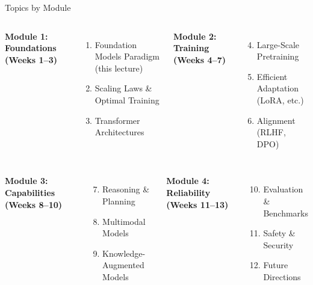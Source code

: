 \documentclass[aspectratio=169,10pt]{beamer}
\begin{document}
\begin{frame}{Topics by Module}
  \begin{columns}[T]
      \textbf{Module 1: Foundations (Weeks 1--3)}
      \begin{enumerate}
        \item Foundation Models Paradigm (this lecture)
        \item Scaling Laws \& Optimal Training
        \item Transformer Architectures
      \end{enumerate}

      \textbf{Module 2: Training (Weeks 4--7)}
      \begin{enumerate}
        \setcounter{enumi}{3}
        \item Large-Scale Pretraining
        \item Efficient Adaptation (LoRA, etc.)
        \item Alignment (RLHF, DPO)
      \end{enumerate}
  \end{columns}

  \vspace{0.3cm}

  \begin{columns}[T]
      \textbf{Module 3: Capabilities (Weeks 8--10)}
      \begin{enumerate}
        \setcounter{enumi}{6}
        \item Reasoning \& Planning
        \item Multimodal Models
        \item Knowledge-Augmented Models
      \end{enumerate}

      \textbf{Module 4: Reliability (Weeks 11--13)}
      \begin{enumerate}
        \setcounter{enumi}{9}
        \item Evaluation \& Benchmarks
        \item Safety \& Security
        \item Future Directions
      \end{enumerate}
  \end{columns}
\end{frame}
\end{document}
